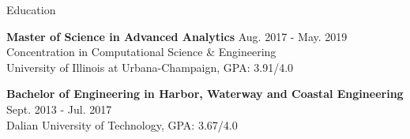 \documentclass{resume} %
\begin{document}
\begin{rSection}{Education}



{\bf Master of Science in Advanced Analytics} \hfill {Aug. 2017 - May. 2019}
\\ 
Concentration in Computational Science \& Engineering
\\
University of Illinois at Urbana-Champaign, GPA: 3.91/4.0


{\bf Bachelor of Engineering in Harbor, Waterway and Coastal Engineering} \hfill {Sept. 2013 - Jul. 2017}
\\ 
Dalian University of Technology, GPA: 3.67/4.0



\end{rSection}
\end{document}
